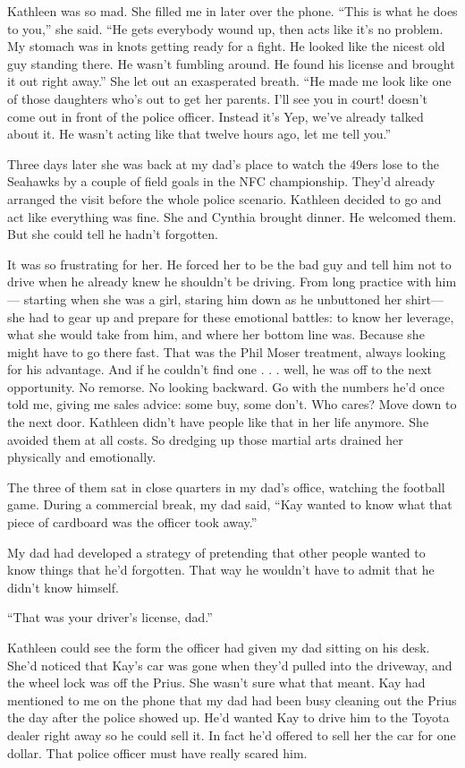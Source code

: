 \documentclass[12pt]{book}
\begin{document}
Kathleen was so mad. She filled me in later over the phone. ``This is what he does to you,'' she said. ``He gets everybody wound up, then acts like it's no problem. My stomach was in knots getting ready for a fight. He looked like the nicest old guy standing there. He wasn't fumbling around. He found his license and brought it out right away.'' She let out an exasperated breath. ``He made me look like one of those daughters who's out to get her parents. I'll see you in court! doesn't come out in front of the police officer. Instead it's Yep, we've already talked about it. He wasn't acting like that twelve hours ago, let me tell you.''

Three days later she was back at my dad's place to watch the 49ers lose to the Seahawks by a couple of field goals in the NFC championship. They'd already arranged the visit before the whole police scenario. Kathleen decided to go and act like everything was fine. She and Cynthia brought dinner. He welcomed them. But she could tell he hadn't forgotten.

It was so frustrating for her. He forced her to be the bad guy and tell him not to drive when he already knew he shouldn't be driving. From long practice with him--- starting when she was a girl, staring him down as he unbuttoned her shirt---she had to gear up and prepare for these emotional battles: to know her leverage, what she would take from him, and where her bottom line was. Because she might have to go there fast. That was the Phil Moser treatment, always looking for his advantage. And if he couldn't find one . . . well, he was off to the next opportunity. No remorse. No looking backward. Go with the numbers he'd once told me, giving me sales advice: some buy, some don't. Who cares? Move down to the next door. Kathleen didn't have people like that in her life anymore. She avoided them at all costs. So dredging up those martial arts drained her physically and emotionally.

The three of them sat in close quarters in my dad's office, watching the football game. During a commercial break, my dad said, ``Kay wanted to know what that piece of cardboard was the officer took away.''

My dad had developed a strategy of pretending that other people wanted to know things that he'd forgotten. That way he wouldn't have to admit that he didn't know himself.

``That was your driver's license, dad.''

Kathleen could see the form the officer had given my dad sitting on his desk. She'd noticed that Kay's car was gone when they'd pulled into the driveway, and the wheel lock was off the Prius. She wasn't sure what that meant. Kay had mentioned to me on the phone that my dad had been busy cleaning out the Prius the day after the police showed up. He'd wanted Kay to drive him to the Toyota dealer right away so he could sell it. In fact he'd offered to sell her the car for one dollar. That police officer must have really scared him.
\end{document}
